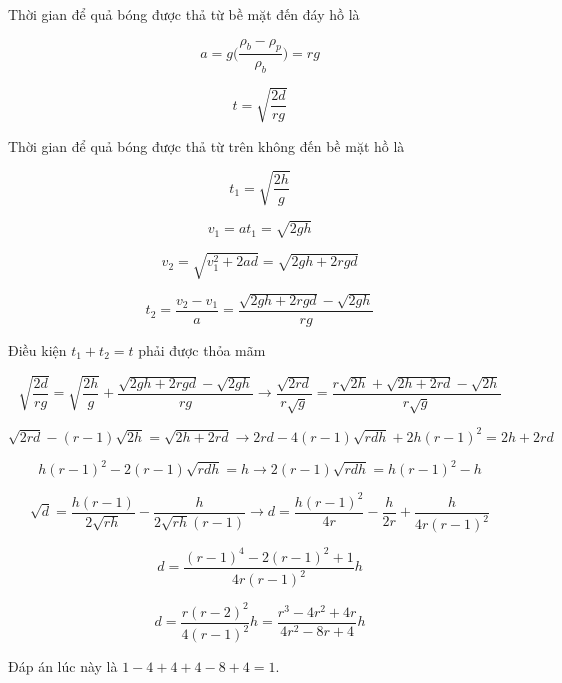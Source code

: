 \begin{solution}
Thời gian để quả bóng được thả từ bề mặt đến đáy hồ là

$$a = g\bigg(\frac{\rho_b - \rho_p}{\rho_b}\bigg) = rg$$

$$t = \sqrt{\frac{2d}{rg}}$$


Thời gian để quả bóng được thả từ trên không đến bề mặt hồ là

$$t_1 = \sqrt{\frac{2h}{g}}$$

$$v_1 = at_1 = \sqrt{2gh}$$

$$v_2 = \sqrt{v_1^2 + 2ad} = \sqrt{2gh + 2rgd}$$

$$t_2 = \frac{v_2 - v_1}{a} = \frac{\sqrt{2gh + 2rgd} - \sqrt{2gh}}{rg}$$

Điều kiện $t_1 + t_2 = t$ phải được thỏa mãm

$$\sqrt{\frac{2d}{rg}} = \sqrt{\frac{2h}{g}} + \frac{\sqrt{2gh + 2rgd} - \sqrt{2gh}}{rg}\longrightarrow\frac{\sqrt{2rd}}{r\sqrt{g}} = \frac{r\sqrt{2h} + \sqrt{2h + 2rd} - \sqrt{2h}}{r\sqrt{g}}$$

$$\sqrt{2rd} - (r-1)\sqrt{2h} = \sqrt{2h + 2rd}\longrightarrow 2rd - 4(r-1)\sqrt{rdh} + 2h(r-1)^2 = 2h + 2rd$$

$$h(r-1)^2 - 2(r-1)\sqrt{rdh} = h\longrightarrow 2(r-1)\sqrt{rdh} = h(r-1)^2 - h$$

$$\sqrt{d} = \frac{h(r-1)}{2\sqrt{rh}} - \frac{h}{2\sqrt{rh}(r-1)}\longrightarrow d = \frac{h(r-1)^2}{4r} - \frac{h}{2r} + \frac{h}{4r(r-1)^2}$$

$$d = \frac{(r-1)^4-2(r-1)^2 + 1}{4r(r-1)^2} h$$

$$d = \frac{r(r-2)^2}{4(r-1)^2}h = \frac{r^3 - 4r^2 + 4r}{4r^2-8r+4}h$$

Đáp án lúc này là $1-4+4+4-8+4=\boxed{1}$.
\end{solution}